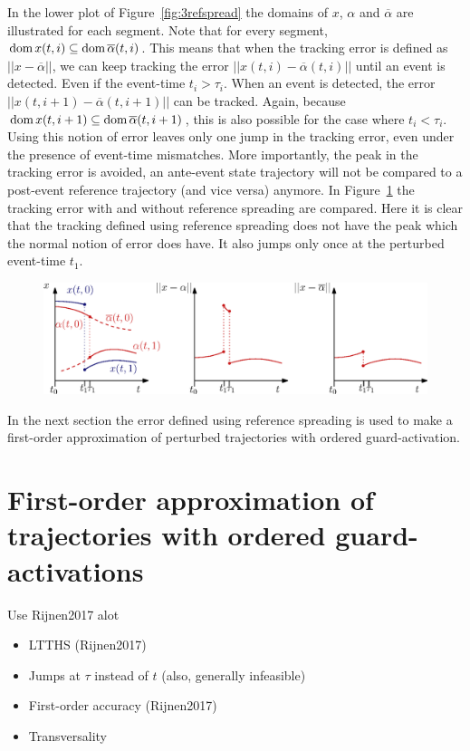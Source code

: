 \documentclass[../DC2017114Bouma.tex]{subfiles}
\begin{document}
In the lower plot of Figure~\ref{fig:3refspread} the domains of $x$, $\alpha$ and $\overline{\alpha}$ are illustrated for each segment. Note that for every segment, $\operatorname{\textnormal{dom}} x(t,i)\subseteq\operatorname{\textnormal{dom}} \overline{\alpha}(t,i)$. This means that when the tracking error is defined as $||x-\overline{\alpha}||$, we can keep tracking the error $||x(t,i)-\overline{\alpha}(t,i)||$ until an event is detected. Even if the event-time $t_i>\tau_i$. When an event is detected, the error  $||x(t,i+1)-\overline{\alpha}(t,i+1)||$ can be tracked. Again, because $\operatorname{\textnormal{dom}} x(t,i+1)\subseteq\operatorname{\textnormal{dom}} \overline{\alpha}(t,i+1)$, this is also possible for the case where $t_i<\tau_i$. Using this notion of error leaves only one jump in the tracking error, even under the presence of event-time mismatches. More importantly, the peak in the tracking error is avoided, an ante-event state trajectory will not be compared to a post-event reference trajectory (and vice versa) anymore. In Figure~\ref{fig:3refspreaderrors} the tracking error with and without reference spreading are compared. Here it is clear that the tracking defined using reference spreading does not have the peak which the normal notion of error does have. It also jumps only once at the perturbed event-time $t_1$.
\begin{figure}[h]
\centering
\includegraphics[width=\textwidth]{refspreaderrors.eps}\caption{} \label{fig:3refspreaderrors}
\end{figure}

In the next section the error defined using reference spreading is used to make a first-order approximation of perturbed trajectories with ordered guard-activation.
\section{First-order approximation of trajectories with ordered guard-activations}
Use Rijnen2017 alot
\begin{itemize}
\item LTTHS (Rijnen2017)
\item Jumps at $\tau$ instead of $t$ (also, generally infeasible)
\item First-order accuracy (Rijnen2017)
\item Transversality
\end{itemize}
\end{document}
